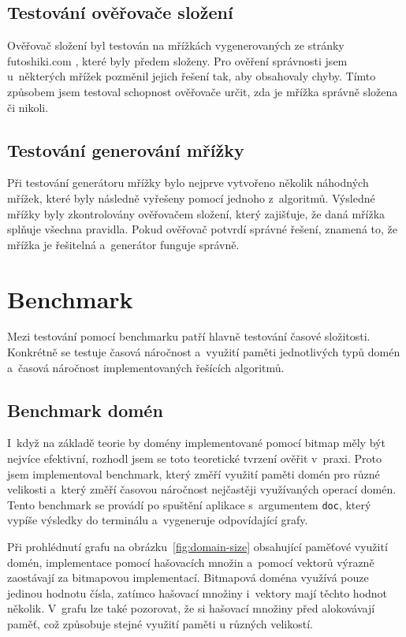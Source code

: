 \subsection*{Testování ověřovače složení}

Ověřovač složení byl testován na mřížkách vygenerovaných ze stránky
futoshiki.com \cite{FutoshikiCom}, které byly předem složeny. Pro ověření
správnosti jsem u~některých mřížek pozměnil jejich řešení tak, aby obsahovaly
chyby. Tímto způsobem jsem testoval schopnost ověřovače určit, zda je mřížka
správně složena či nikoli.

\subsection*{Testování generování mřížky}

Při testování generátoru mřížky bylo nejprve vytvořeno několik náhodných
mřížek, které byly následně vyřešeny pomocí jednoho z~algoritmů. Výsledné
mřížky byly zkontrolovány ověřovačem složení, který zajišťuje, že daná mřížka
splňuje všechna pravidla. Pokud ověřovač potvrdí správné řešení, znamená to, že
mřížka je řešitelná a~generátor funguje správně.

\section{Benchmark}

Mezi testování pomocí benchmarku patří hlavně testování časové složitosti.
Konkrétně se testuje časová náročnost a~využití paměti jednotlivých typů domén
a~časová náročnost implementovaných řešících algoritmů.

\subsection{Benchmark domén}
\label{sec:domain-benchmark}

I~když na základě teorie by domény implementované pomocí bitmap měly být
nejvíce efektivní, rozhodl jsem se toto teoretické tvrzení ověřit v~praxi.
Proto jsem implementoval benchmark, který změří využití paměti domén pro různé
velikosti a~který změří časovou náročnost nejčastěji využívaných operací domén.
Tento benchmark se provádí po spuštění aplikace s~argumentem \texttt{doc},
který vypíše výsledky do terminálu a~vygeneruje odpovídající grafy.

Při prohlédnutí grafu na obrázku~\ref{fig:domain-size} obsahující
paměťové využití domén, implementace pomocí hašovacích množin a~pomocí vektorů
výrazně zaostávají za bitmapovou implementací. Bitmapová doména využívá pouze
jedinou hodnotu čísla, zatímco hašovací množiny i~vektory mají těchto hodnot
několik. V~grafu lze také pozorovat, že si hašovací množiny před alokovávají
paměť, což způsobuje stejné využití paměti u různých velikostí.

